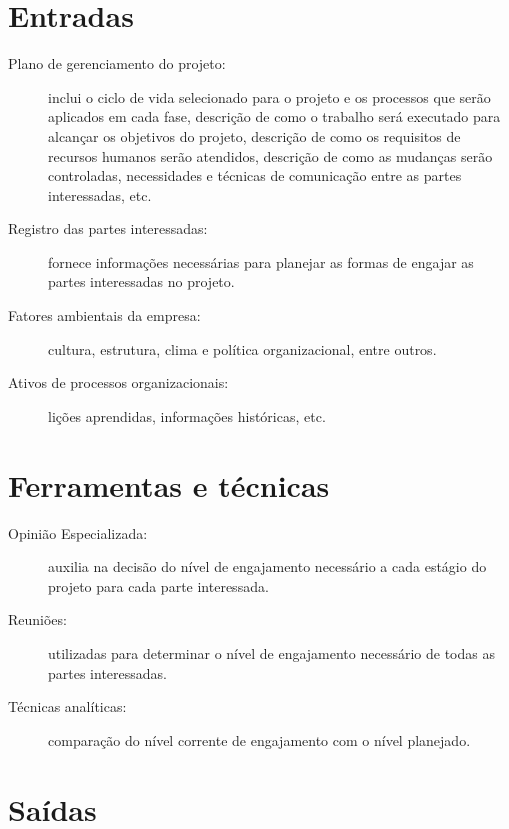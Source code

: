 \section{Entradas}

\begin{description}
	
	\item[Plano de gerenciamento do projeto:] inclui o ciclo de vida selecionado para o projeto e os processos que serão aplicados em cada fase, descrição de como o trabalho será executado para alcançar os objetivos do projeto, descrição de como os requisitos de recursos humanos serão atendidos, descrição de como as mudanças serão controladas, necessidades e técnicas de comunicação entre as partes interessadas, etc.
	
	\item[Registro das partes interessadas:] fornece informações necessárias para planejar as formas de engajar as partes interessadas no projeto.
	
	\item[Fatores ambientais da empresa:] cultura, estrutura, clima e política organizacional, entre outros.
	
	\item[Ativos de processos organizacionais:] lições aprendidas, informações históricas, etc.
	
\end{description}

\section{Ferramentas e técnicas}

\begin{description}
	
	\item[Opinião Especializada:] auxilia na decisão do nível de engajamento necessário a cada estágio do projeto para cada parte interessada.
	
	\item[Reuniões:] utilizadas para determinar o nível de engajamento necessário de todas as partes interessadas.
	
	\item[Técnicas analíticas:] comparação do nível corrente de engajamento com o nível planejado.
		
\end{description}

\section{Saídas}

